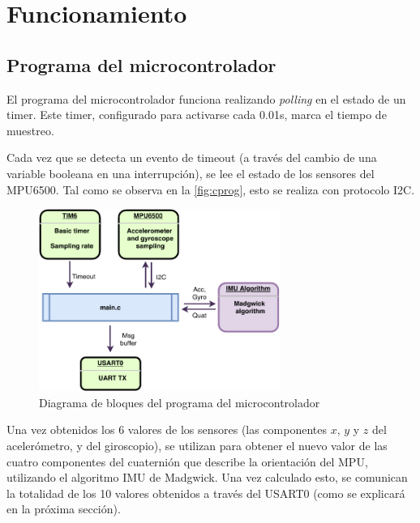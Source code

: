 \documentclass{article}
\begin{document}




\section{Funcionamiento}

\subsection{Programa del microcontrolador}

El programa del microcontrolador funciona realizando \emph{polling} en el estado de un timer. Este timer, configurado para activarse cada 0.01s, marca el tiempo de muestreo. 

Cada vez que se detecta un evento de timeout (a trav\'es del cambio de una variable booleana en una interrupci\'on), se lee el estado de los sensores del MPU6500. Tal como se observa en la \autoref{fig:cprog}, esto se realiza con protocolo I2C.

\begin{figure}[ht]
	\centering
	\includegraphics[width=0.7\textwidth]{imgs/cprog.pdf}
	\caption{Diagrama de bloques del programa del microcontrolador}
	\label{fig:cprog}
\end{figure}

Una vez obtenidos los 6 valores de los sensores (las componentes $x$, $y$ y $z$ del aceler\'ometro, y del giroscopio), se utilizan para obtener el nuevo valor de las cuatro componentes del cuaterni\'on que describe la orientaci\'on del MPU, utilizando el algoritmo IMU de Madgwick. Una vez calculado esto, se comunican la totalidad de los 10 valores obtenidos a trav\'es del USART0 (como se explicar\'a en la pr\'oxima secci\'on).
\end{document}
